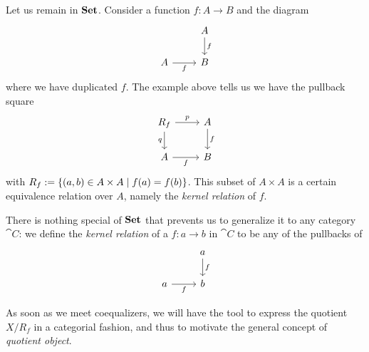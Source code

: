 Let us remain in \(\mathbf{Set}\). Consider a function \(f : A \to B\) and the
diagram
\[\begin{tikzcd}
    & A \ar["f", d] \\
    A \ar["f", r, swap] & B
  \end{tikzcd}\] where we have duplicated \(f\). The example above
tells us we have the pullback square
\[\begin{tikzcd}
    R_f \ar["p", r] \ar["q", d, swap] & A \ar["f", d] \\
    A \ar["f", r, swap] & B
  \end{tikzcd}\] with
\(R_f := \left\{(a, b) \in A \times A \mid f(a) = f(b)\right\}\). This subset of
\(A \times A\) is a certain equivalence relation over \(A\), namely the
{\em kernel relation} of \(f\). 

There is nothing special of \(\mathbf{Set}\) that prevents us to generalize it
to any category \(\cat C\): we define the {\em kernel relation} of a
\(f : a \to b\) in \(\cat C\) to be any of the pullbacks of
\[\begin{tikzcd}
    & a \ar["f", d] \\
    a \ar["f", r, swap] & b
  \end{tikzcd}\]

As soon as we meet coequalizers, we will have the tool to express the
quotient \({X}{/}{R_f}\) in a categorial fashion, and thus to motivate
the general concept of {\em quotient object}.


